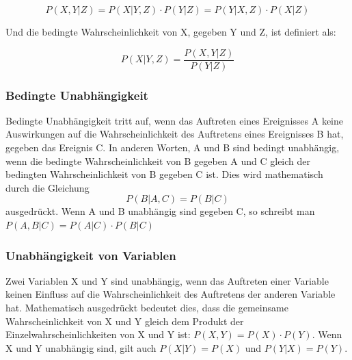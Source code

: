\documentclass[letterpaper, titlepage]{article}
\begin{document}
\begin{equation} P(X, Y|Z) = P(X|Y, Z) \cdot P(Y|Z) = P(Y|X, Z) \cdot P(X|Z) \end{equation}

Und die bedingte Wahrscheinlichkeit von X, gegeben Y und Z, ist definiert als:

\begin{equation} P(X|Y, Z) = \frac{P(X, Y|Z)}{P(Y|Z)} \end{equation}

\vspace{0.35cm}

\subsubsection{Bedingte Unabhängigkeit}\label{Bedingte Unabhängigkeit} 
Bedingte Unabhängigkeit tritt auf, wenn das Auftreten eines Ereignisses A keine Auswirkungen auf die Wahrscheinlichkeit des Auftretens eines Ereignisses B hat, gegeben das Ereignis C. In anderen Worten, A und B sind bedingt unabhängig, wenn die bedingte Wahrscheinlichkeit von B gegeben A und C gleich der bedingten Wahrscheinlichkeit von B gegeben C ist. Dies wird mathematisch durch die Gleichung \begin{equation} P(B|A,C) = P(B|C) \end{equation} ausgedrückt. Wenn A und B unabhängig sind gegeben C, so schreibt man 
$P(A,B|C) = P(A|C) \cdot P(B|C)$

\vspace{0.35cm}

\subsubsection{Unabhängigkeit von Variablen}\label{Unabhängigkeit von Variablen} 
Zwei Variablen X und Y sind unabhängig, wenn das Auftreten einer Variable keinen Einfluss auf die Wahrscheinlichkeit des Auftretens der anderen Variable hat. Mathematisch ausgedrückt bedeutet dies, dass die gemeinsame Wahrscheinlichkeit von X und Y gleich dem Produkt der Einzelwahrscheinlichkeiten von X und Y ist: $P(X,Y) = P(X) \cdot P(Y)$. Wenn X und Y unabhängig sind, gilt auch $P(X|Y) = P(X)$ und $P(Y|X) = P(Y)$.

\vspace{0.35cm}
\end{document}
